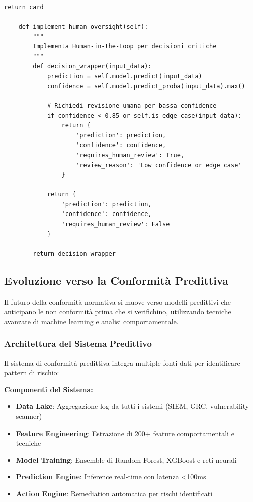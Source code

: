 \begin{lstlisting}[caption={Framework Python per AI Act Compliance},label={lst:ai_compliance}]
        return card
    
    def implement_human_oversight(self):
        """
        Implementa Human-in-the-Loop per decisioni critiche
        """
        def decision_wrapper(input_data):
            prediction = self.model.predict(input_data)
            confidence = self.model.predict_proba(input_data).max()
            
            # Richiedi revisione umana per bassa confidence
            if confidence < 0.85 or self.is_edge_case(input_data):
                return {
                    'prediction': prediction,
                    'confidence': confidence,
                    'requires_human_review': True,
                    'review_reason': 'Low confidence or edge case'
                }
            
            return {
                'prediction': prediction,
                'confidence': confidence,
                'requires_human_review': False
            }
        
        return decision_wrapper
\end{lstlisting}

\subsection{Evoluzione verso la Conformità Predittiva}

Il futuro della conformità normativa si muove verso modelli predittivi che anticipano le non conformità prima che si verifichino, utilizzando tecniche avanzate di machine learning e analisi comportamentale.

\subsubsection{Architettura del Sistema Predittivo}

Il sistema di conformità predittiva integra multiple fonti dati per identificare pattern di rischio:

\textbf{Componenti del Sistema:}
\begin{itemize}
    \item \textbf{Data Lake}: Aggregazione log da tutti i sistemi (SIEM, GRC, vulnerability scanner)
    \item \textbf{Feature Engineering}: Estrazione di 200+ feature comportamentali e tecniche
    \item \textbf{Model Training}: Ensemble di Random Forest, XGBoost e reti neurali
    \item \textbf{Prediction Engine}: Inference real-time con latenza <100ms
    \item \textbf{Action Engine}: Remediation automatica per rischi identificati
\end{itemize}

